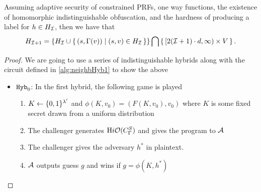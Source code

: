 \begin{lemma}
	Assuming adaptive security of constrained PRFs, one way functions, the existence of homomorphic indistinguishable obfuscation,
	and the hardness of producing a label for $h \in H_{\mathcal{I}}$,
	then we have that
	$$H_{\mathcal{I} + 1} = \left\{ H_{\mathcal{I}} \cup \set{(s, \Gamma(v)) \mid (s, v) \in H_{\mathcal{I}}} \right\} \bigcap \set{ [2 (\mathcal{I}+ 1) \cdot d, \infty) \times V}.$$

	\begin{proof}
		We are going to use a series of indistinguishable hybrids along with the circuit defined in \ref{alg:neighbHyb1} to show the above
		\begin{itemize}
			\item $\texttt{Hyb}_0$: In the first hybrid, the following game is played
				\begin{enumerate}
					\item $K \gets \{0,1\}^{\lambda'}$ and $\phi(K, v_0) = (F(K, v_0), v_0)$ where $K$ is some fixed secret drawn from a uniform distribution
					\item The challenger generates $\text{H}i\mathcal{O}({C_\Gamma^S})$ and gives the program to $\mathcal{A}$
					\item The challenger gives the adversary $h^*$ in plaintext.
					\item $\mathcal{A}$ outputs guess $g$ and wins if $g = \phi(K, h^*)$ %
				\end{enumerate}
			

\end{itemize}
\end{proof}
\end{lemma}
